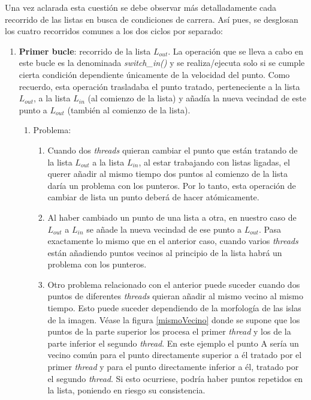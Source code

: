 Una vez aclarada esta cuesti\'{o}n se debe observar m\'{a}s detalladamente cada recorrido de las listas en busca de condiciones de carrera. As\'{i} pues, se desglosan los cuatro recorridos comunes a los dos ciclos por separado:

\begin{enumerate}
	\item \textbf{Primer bucle}: recorrido de la lista $L_{out}$. La operaci\'{o}n que se lleva a cabo en este bucle es la denominada \textit{switch\_in()} y se realiza/ejecuta solo si se cumple cierta condici\'{o}n dependiente \'{u}nicamente de la velocidad del punto. Como recuerdo, esta operaci\'{o}n trasladaba el punto tratado, perteneciente a la lista $L_{out}$, a la lista $L_{in}$ (al comienzo de la lista) y a\~{n}ad\'{i}a la nueva vecindad de este punto a $L_{out}$ (tambi\'{e}n al comienzo de la lista).
	\begin{enumerate}
		\item Problema:	
			\begin{enumerate}
				\item Cuando dos \textit{threads} quieran cambiar el punto que est\'{a}n tratando de la lista $L_{out}$ a la lista $L_{in}$, al estar trabajando con listas ligadas, el querer a\~{n}adir al mismo tiempo dos puntos al comienzo de la lista dar\'{i}a un problema con los punteros. Por lo tanto, esta operaci\'{o}n de cambiar de lista un punto deber\'{a} de hacer at\'{o}micamente. 
				\item Al haber cambiado un punto de una lista a otra, en nuestro caso de $L_{out}$ a $L_{in}$ se a\~{n}ade la nueva vecindad de ese punto a $L_{out}$. Pasa exactamente lo mismo que en el anterior caso, cuando varios \textit{threads} est\'{a}n a\~{n}adiendo puntos vecinos al principio de la lista habr\'{a} un problema con los punteros. 
				\item Otro problema relacionado con el anterior puede suceder cuando dos puntos de diferentes \textit{threads} quieran a\~{n}adir al mismo vecino al mismo tiempo. Esto puede suceder dependiendo de la morfolog\'{i}a de las islas de la imagen. V\'{e}ase la figura \ref{mismoVecino} donde se supone que los puntos de la parte superior los procesa el primer \textit{thread} y los de la parte inferior el segundo \textit{thread}. En este ejemplo el punto A ser\'{i}a un vecino com\'{u}n para el punto directamente superior a \'{e}l tratado por el primer \textit{thread} y para el punto directamente inferior a \'{e}l, tratado por el segundo \textit{thread}. Si esto ocurriese, podr\'{i}a haber puntos repetidos en la lista, poniendo en riesgo su consistencia. 

\end{enumerate}
\end{enumerate}
\end{enumerate}
